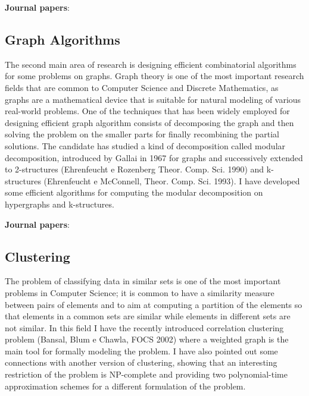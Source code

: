 \documentclass[11pt,a4paper,roman]{moderncv}
\begin{document}
\textbf{Journal papers}:~\cite{ciccolellaMALVIRUSIntegratedApplication2022,DBLP:journals/bmcbi/BerettaPZVB18,DBLP:journals/tcbb/PirolaVBSB12,DBLP:journals/tcbb/BonizzoniVDPR10,DBLP:journals/ijbra/BonizzoniVDM05,DBLP:journals/jcst/BonizzoniVDL03}

\subsection{Graph Algorithms}\label{graph-algorithms}

The second main area of research is designing efficient combinatorial
algorithms for some problems on graphs. Graph theory is one of the most
important research fields that are common to Computer Science and
Discrete Mathematics, as graphs are a mathematical device that is
suitable for natural modeling of various real-world problems. One of the
techniques that has been widely employed for designing efficient graph
algorithm consists of decomposing the graph and then solving the problem
on the smaller parts for finally recombining the partial solutions. The
candidate has studied a kind of decomposition called modular
decomposition, introduced by Gallai in 1967 for graphs and successively
extended to 2-structures (Ehrenfeucht e Rozenberg Theor. Comp. Sci.
1990) and k-structures (Ehrenfeucht e McConnell, Theor. Comp. Sci.
1993). I have developed some efficient algorithms for
computing the modular decomposition on hypergraphs and k-structures.


\textbf{Journal papers}:~\cite{DBLP:journals/jal/BonizzoniV99}


\subsection{Clustering}\label{clustering}

The problem of classifying data in similar sets is one of the most
important problems in Computer Science; it is common to have a
similarity measure between pairs of elements and to aim at computing a
partition of the elements so that elements in a common sets are similar
while elements in different sets are not similar. In this field
I have the recently introduced correlation clustering
problem (Bansal, Blum e Chawla, FOCS 2002) where a weighted graph is the
main tool for formally modeling the problem. I have also pointed out
some connections with another version of clustering, showing that an
interesting restriction of the problem is NP-complete and providing two
polynomial-time approximation schemes for a different formulation of the
problem.
\end{document}
